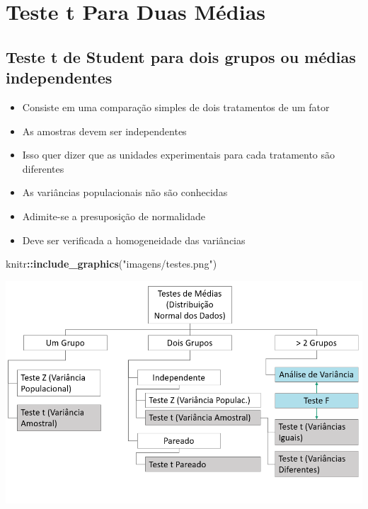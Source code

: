 \documentclass[
]{book}
\newenvironment{Shaded}{\begin{snugshade}}{\end{snugshade}}
\newcommand{\FunctionTok}[1]{\textcolor[rgb]{0.13,0.29,0.53}{\textbf{#1}}}
\newcommand{\NormalTok}[1]{#1}
\newcommand{\SpecialCharTok}[1]{\textcolor[rgb]{0.81,0.36,0.00}{\textbf{#1}}}
\newcommand{\StringTok}[1]{\textcolor[rgb]{0.31,0.60,0.02}{#1}}
\providecommand{\tightlist}{%
  \setlength{\itemsep}{0pt}\setlength{\parskip}{0pt}}
\begin{document}
\chapter{Teste t Para Duas Médias}\label{teste-t-para-duas-muxe9dias}

\section{Teste t de Student para dois grupos ou médias independentes}\label{teste-t-de-student-para-dois-grupos-ou-muxe9dias-independentes}

\begin{itemize}
\tightlist
\item
  Consiste em uma comparação simples de dois tratamentos de um fator
\item
  As amostras devem ser independentes
\item
  Isso quer dizer que as unidades experimentais para cada tratamento são diferentes
\item
  As variâncias populacionais não são conhecidas
\item
  Adimite-se a presuposição de normalidade
\item
  Deve ser verificada a homogeneidade das variâncias
\end{itemize}

\begin{Shaded}
\begin{Highlighting}[]
\NormalTok{knitr}\SpecialCharTok{::}\FunctionTok{include\_graphics}\NormalTok{(}\StringTok{"imagens/testes.png"}\NormalTok{)}
\end{Highlighting}
\end{Shaded}

\includegraphics{imagens/testes.png}
\end{document}
